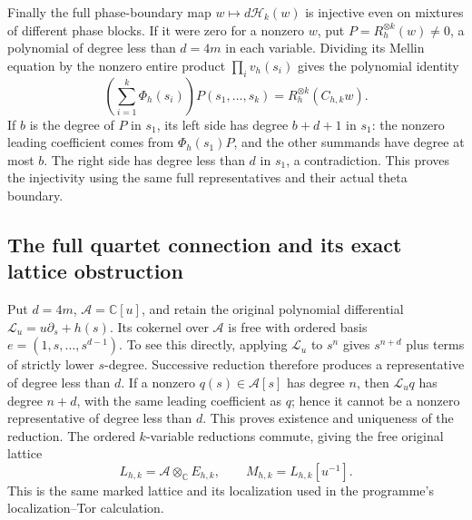 Finally the full phase-boundary map
\(w\mapsto d\mathcal H_k(w)\) is injective even on mixtures of
different phase blocks. If it were zero for a nonzero \(w\), put
\(P=R_h^{\otimes k}(w)\ne0\), a polynomial of degree less than
\(d=4m\) in each variable. Dividing its Mellin equation by the
nonzero entire product \(\prod_i v_h(s_i)\) gives the polynomial
identity
\[
 \left(\sum_{i=1}^k\Phi_h(s_i)\right)P(s_1,\ldots,s_k)
       =R_h^{\otimes k}(C_{h,k}w).
 \tag{QPS.28}
\]
If \(b\) is the degree of \(P\) in \(s_1\), its left side has
degree \(b+d+1\) in \(s_1\): the nonzero leading coefficient
comes from \(\Phi_h(s_1)P\), and the other summands have degree
at most \(b\). The right side has degree less than \(d\) in
\(s_1\), a contradiction. This proves the injectivity using the
same full representatives and their actual theta boundary.

\subsection{The full quartet connection and its exact lattice obstruction}

Put \(d=4m\), \(\mathcal A=\mathbb{C}[u]\), and retain the
original polynomial differential
\(\mathcal L_u=u\partial_s+h(s)\). Its cokernel over \(\mathcal A\)
is free with ordered basis
\(e=(1,s,\ldots,s^{d-1})\). To see this directly, applying
\(\mathcal L_u\) to \(s^n\) gives \(s^{n+d}\) plus terms of
strictly lower \(s\)-degree. Successive reduction therefore
produces a representative of degree less than \(d\). If a nonzero
\(q(s)\in\mathcal A[s]\) has degree \(n\), then
\(\mathcal L_uq\) has degree \(n+d\), with the same leading
coefficient as \(q\); hence it cannot be a nonzero representative
of degree less than \(d\). This proves existence and uniqueness
of the reduction. The ordered \(k\)-variable reductions commute,
giving the free original lattice
\[
 L_{h,k}=\mathcal A\otimes_{\mathbb{C}}E_{h,k},\qquad
 M_{h,k}=L_{h,k}[u^{-1}].
 \tag{QPS.29}
\]
This is the same marked lattice and its localization used in the
programme's localization--Tor calculation.

